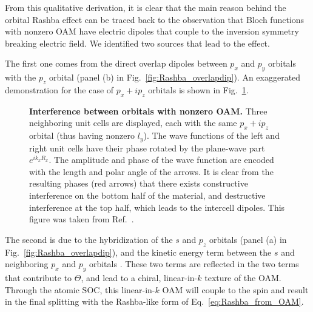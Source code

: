 From this qualitative derivation, it is clear that the main reason behind the orbital Rashba effect can be traced back to the observation that Bloch functions with nonzero OAM have electric dipoles that couple to the inversion symmetry breaking electric field.
We identified two sources that lead to the effect.

The first one comes from the direct overlap dipoles between $p_x$ and $p_y$ orbitals with the $p_z$ orbital (panel (b) in Fig.~\ref{fig:Rashba_overlapdip})\cite{Petersen2000}.
An exaggerated demonstration for the case of $p_x + ip_z$ orbitals is shown in Fig.~\ref{fig:Rashba_interference}.
\begin{figure}[t!]
\caption{\label{fig:Rashba_interference}{\bf Interference between orbitals with nonzero OAM.} Three neighboring unit cells are displayed, each with the same $p_x + ip_z$ orbital (thus having nonzero $l_y$). The wave functions of the left and right unit cells have their phase rotated by the plane-wave part $e^{i k_x R_x}$. The amplitude and phase of the wave function are encoded with the length and polar angle of the arrows. It is clear from the resulting phases (red arrows) that there exists constructive interference on the bottom half of the material, and destructive interference at the top half, which leads to the intercell dipoles. This figure was taken from Ref.~\cite{Ponet2018}.}
\end{figure}

The second is due to the hybridization of the $s$ and $p_z$ orbitals (panel (a) in Fig.~\ref{fig:Rashba_overlapdip}), and the kinetic energy term between the $s$ and neighboring $p_x$ and $p_y$ orbitals \cite{Go2016}.
These two terms are reflected in the two terms that contribute to $\Theta$, and lead to a chiral, linear-in-$k$ texture of the OAM.
Through the atomic SOC, this linear-in-$k$ OAM will couple to the spin and result in the final splitting with the Rashba-like form of Eq.~\ref{eq:Rashba_from_OAM}.

